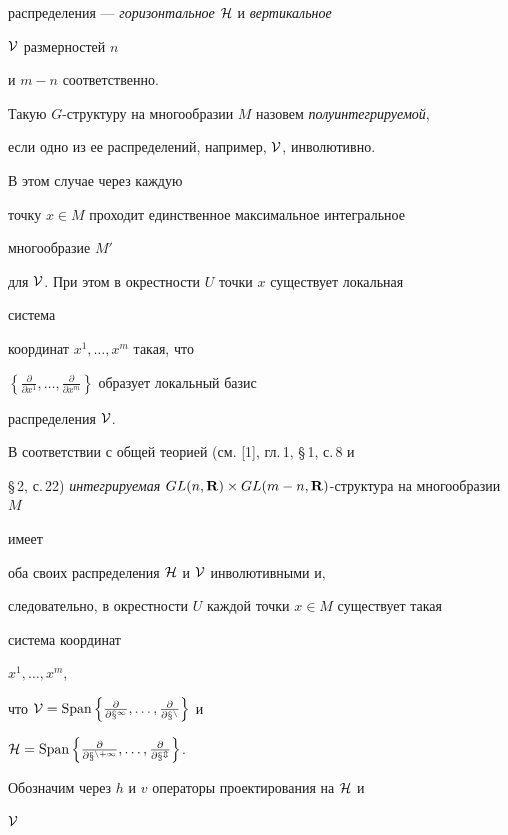 распределения --- {\it горизонтальное} $\cal H$ и {\it вертикальное} 


$\cal V$ размерностей $n$ 


и $m-n$ соответственно. 


 


Такую $G$-структуру на многообразии $M$ назовем {\it полуинтегрируемой}, 


если одно из ее распределений, например, $\cal V$, инволютивно.


В этом случае через каждую 


точку $x\in M$ проходит единственное максимальное интегральное 


многообразие $M'$ 


для $\cal V$. При этом в окрестности $U$ точки $x$ существует локальная 


система 


координат $x^1,\dotsc,x^m$ такая, что 


$\left\{\frac{\partial}{\partial x^1},\dotsc, 


\frac{\partial}{\partial x^m}\right\}$ образует локальный базис 


распределения $\cal V$. 


 


В соответствии с общей теорией (см. [1], гл.\,1, \S\,1, с.\,8 и 


\S\,2, с.\,22) {\it интегрируемая} $GL(n,\bold R)\times GL(m-n,\bold R)$-структура на многообразии $M$ 


имеет 


оба своих распределения $\cal H$ и $\cal V$ инволютивными и, 


следовательно, в окрестности $U$ каждой точки $x\in M$ существует такая 


система координат 


$x^1,\dotsc,x^m$, 


что $\cal V=\Span\left\{\frac{\partial}{\partial x^1},\dotsc, 


\frac{\partial}{\partial x^n}\right\}$ и 


$\cal H=\Span\left\{\frac{\partial}{\partial x^{n+1}},\dotsc, 


\frac{\partial}{\partial x^m}\right\}$. 


 


Обозначим через $h$ и $v$ операторы проектирования на $\cal H$ и 


$\cal V$ 


